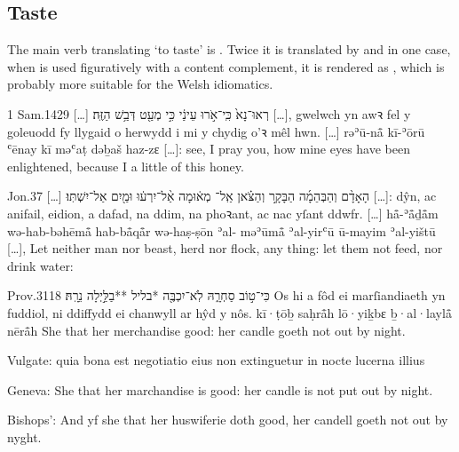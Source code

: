 \subsection{Taste}


\begin{paper}
	The main verb translating  ‘to taste’ is . Twice it is translated by  and in one case, when  is used figuratively with a content complement, it is rendered as , which is probably more suitable for the Welsh idiomatics.
\end{paper}

\begin{example}{1 Sam.}{14}{29}{}{}
	\quoling
	{[…] רְאוּ־נָא֙ כִּֽי־אֹ֣רוּ עֵינַ֔י כִּ֣י  מְעַ֖ט דְּבַ֥שׁ הַזֶּֽה׃}
	{[…], gwelwch yn awꝛ fel y goleuodd fy llygaid o herwydd i mi  y chydig o’ꝛ mêl hwn.}
	{[…] rəʾū-nå̄ kī-ʾōrū ʿēnay kī  məʿaṭ dəḇaš haz-zɛ}
	{[…]: see, I pray you, how mine eyes have been enlightened, because I  a little of this honey.}
\end{example}

\begin{example}{Jon.}{3}{7}{}{}
	\quoling
	{[…] הָאָדָ֨ם וְהַבְּהֵמָ֜ה הַבָּקָ֣ר וְהַצֹּ֗אן אַֽל־ מְא֔וּמָה אַ֨ל־יִרְע֔וּ וּמַ֖יִם אַל־יִשְׁתּֽוּ׃}
	{[…]: dŷn, ac anifail, eidion, a dafad, na  ddim, na phoꝛant, ac nac yſant ddwfr.}
	{[…] hå̄-ʾå̄ḏå̄m wə-hab-bəhēmå̄ hab-bå̄qå̄r wə-haṣ-ṣōn ʾal- məʾūmå̄ ʾal-yirʿū ū-mayim ʾal-yištū}
	{[…], Let neither man nor beast, herd nor flock,  any thing: let them not feed, nor drink water:}
\end{example}

\begin{example}{Prov.}{31}{18}{}{}
	\quoling
	{ כִּי־ט֣וֹב סַחְרָ֑הּ לֹֽא־יִכְבֶּ֖ה *בליל **בַלַּ֣יְלָה נֵרָֽהּ׃}
	{Os hi a  fôd ei marſiandiaeth yn fuddiol, ni ddiffydd ei chanwyll ar hŷd y nôs.}
	{ kī·ṭōḇ saḥrå̄h lō·yiḵbɛ ḇ·al·laylå̄ nērå̄h}
	{She  that her merchandise  good: her candle goeth not out by night.}
\end{example}
\begin{compactdesc}
	\item [Vulgate:]  quia bona est negotiatio eius non extinguetur in nocte lucerna illius
	\item [Geneva:] She  that her marchandise is good: her candle is not put out by night.
	\item [Bishops’:] And yf she  that her huswiferie doth good, her candell goeth not out by nyght.
\end{compactdesc}



